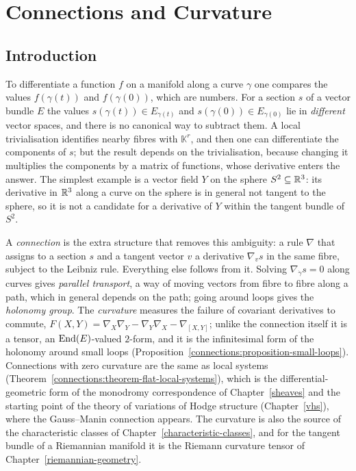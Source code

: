 \chapter{Connections and Curvature}\label{connections}

\section{Introduction}\label{connections:section-introduction}

To differentiate a function $f$ on a manifold along a curve $\gamma$ one compares the values $f(\gamma(t))$ and $f(\gamma(0))$, which are numbers. For a section $s$ of a vector
bundle $E$ the values $s(\gamma(t)) \in E_{\gamma(t)}$ and $s(\gamma(0)) \in E_{\gamma(0)}$ lie in \emph{different} vector spaces, and there is no canonical way to subtract
them. A local trivialisation identifies nearby fibres with $\mathbb{K}^r$, and then one can differentiate the components of $s$; but the result depends on the trivialisation,
because changing it multiplies the components by a matrix of functions, whose derivative enters the answer. The simplest example is a vector field $Y$ on the sphere
$S^2 \subseteq \mathbb{R}^3$: its derivative in $\mathbb{R}^3$ along a curve on the sphere is in general not tangent to the sphere, so it is not a candidate for a derivative of $Y$ within
the tangent bundle of $S^2$.

A \emph{connection} is the extra structure that removes this ambiguity: a rule $\nabla$ that assigns to a section $s$ and a tangent vector $v$ a derivative $\nabla_vs$ in the
same fibre, subject to the Leibniz rule. Everything else follows from it. Solving $\nabla_{\dot\gamma}s = 0$ along curves gives \emph{parallel transport}, a way of moving
vectors from fibre to fibre along a path, which in general depends on the path; going around loops gives the \emph{holonomy group}. The \emph{curvature} measures the failure
of covariant derivatives to commute, $F(X, Y) = \nabla_X\nabla_Y - \nabla_Y\nabla_X - \nabla_{[X, Y]}$; unlike the connection itself it is a tensor, an $\operatorname{End}(E)$-valued
$2$-form, and it is the infinitesimal form of the holonomy around small loops (Proposition~\ref{connections:proposition-small-loops}). Connections with zero curvature are the
same as local systems (Theorem~\ref{connections:theorem-flat-local-systems}), which is the differential-geometric form of the monodromy correspondence of
Chapter~\ref{sheaves} and the starting point of the theory of variations of Hodge structure (Chapter~\ref{vhs}), where the Gauss--Manin connection appears. The curvature is
also the source of the characteristic classes of Chapter~\ref{characteristic-classes}, and for the tangent bundle of a Riemannian manifold it is the Riemann curvature tensor
of Chapter~\ref{riemannian-geometry}.

